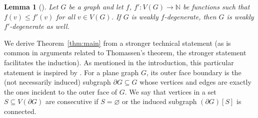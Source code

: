\documentclass[11pt]{article}
\theoremstyle{slantthm}
\newtheorem{lemma}[thm]{Lemma}
\numberwithin{equation}{section}
\theoremstyle{definition}
\renewcommand{\leq}{\leqslant}
\newcommand{\bemph}[1]{{\normalfont#1}}
\newcommand{\ep}[1]{\bemph{(}#1\bemph{)}}
\numberwithin{equation}{section}
\newcommand{\N}{\mathbb{N}}
\newcommand{\0}{\varnothing}
\newcommand{\emphd}[1]{{\fontseries{b}\selectfont\textsf{#1}}}
\newcommand{\bdry}[1]{{\partial #1}}
\begin{document}
    \begin{lemma}[{\cite[Lemma 2.1]{WD}}]\label{lemma:monotone}
        Let $G$ be a graph and let $f$, $f' \colon V(G) \to \N$ be functions such that $f(v) \leq f'(v)$ for all $v \in V(G)$. If $G$ is weakly $f$-degenerate, then $G$ is weakly $f'$-degenerate as well. 
    \end{lemma}

    
    We derive Theorem~\ref{thm:main} from a stronger technical statement \ep{as is common in arguments related to Thomassen's theorem, the stronger statement facilitates the induction}. As mentioned in the introduction, this particular statement is inspired by \cite[Theorem 6]{DLM}. %
    For a plane graph $G$, its \emphd{outer face boundary} is the (not necessarily induced) subgraph $\bdry{G} \subseteq G$ whose vertices and edges are exactly the ones incident to the outer face of $G$. We say that vertices in a set $S \subseteq V(\bdry{G})$ are \emphd{consecutive} if $S = \0$ or the induced subgraph $(\bdry{G})[S]$ is connected.
    
\end{document}
